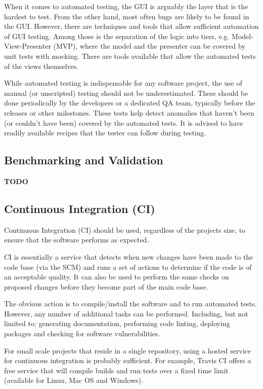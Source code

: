 \documentclass[jnr]{iosart2x}
\newcommand{\todo}[1]{\textbf{#1}}
\begin{document}
When it comes to automated testing, the GUI is arguably the layer that is the hardest to test.
From the other hand, most often bugs are likely to be found in the GUI.
However, there are techniques and tools that allow sufficient automation of GUI testing.
Among those is the separation of the logic into tiers, e.g. Model-View-Presenter (MVP), where the model and the presenter can be covered by unit tests with mocking.
There are tools available that allow the automated tests of the views themselves.

While automated testing is indispensable for any software project, the use of manual (or unscripted) testing should not be underestimated. 
These should be done periodically by the developers or a dedicated QA team, typically before the releases or other milestones.
These tests help detect anomalies that haven't been (or couldn't have been) covered by the automated tests.
It is advised to have readily available recipes that the tester can follow during testing.

\subsection{Benchmarking and Validation}
\label{Benchmarking and Validation}

\todo{TODO}

\subsection{Continuous Integration (CI)}
\label{Continuous integration}

Continuous Integration (CI) should be used, regardless of the projects size, to ensure that the software performs as expected.

CI is essentially a service that detects when new changes have been made to the code base (via the SCM) and runs a set of actions to determine if the code is of an acceptable quality.
It can also be used to perform the same checks on proposed changes before they become part of the main code base.

The obvious action is to compile/install the software and to run automated tests.
However, any number of additional tasks can be performed.
Including, but not limited to; generating documentation, performing code linting, deploying packages and checking for software vulnerabilities.

For small scale projects that reside in a single repository, using a hosted service for continuous integration is probably sufficient.
For example, Travis CI \cite{Travis_CI} offers a free service that will compile builds and run tests over a fixed time limit (available for Linux, Mac OS and Windows).
\end{document}
